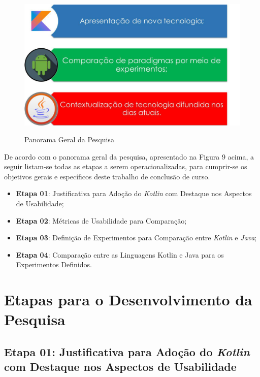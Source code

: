 \FloatBarrier
\begin{figure}[!htbp]
	\centering
		\caption{Panorama Geral da Pesquisa}
	\includegraphics[scale=0.5]{imagens/metodologia1}
	\label{fig:figura3}
\end{figure}
\FloatBarrier

De acordo com o panorama geral da pesquisa, apresentado na Figura 9 acima, a seguir listam-se todas as etapas a serem operacionalizadas, para cumprir-se os objetivos gerais e específicos deste trabalho de conclusão de curso.

\begin{itemize}
    \item \textbf{Etapa 01}: Justificativa para Adoção do \textit{Kotlin} com Destaque nos Aspectos de Usabilidade;
    
    \item \textbf{Etapa 02}: Métricas de Usabilidade para Comparação;
    
   \item \textbf{Etapa 03}: Definição de Experimentos para Comparação entre \textit{Kotlin} e \textit{Java};

   \item \textbf{Etapa 04}: Comparação entre as Linguagens Kotlin e Java para os Experimentos Definidos.
\end{itemize}

\section{Etapas para o Desenvolvimento da Pesquisa}

\subsection{Etapa 01: Justificativa para Adoção do \textit{Kotlin} com Destaque nos Aspectos de Usabilidade}

